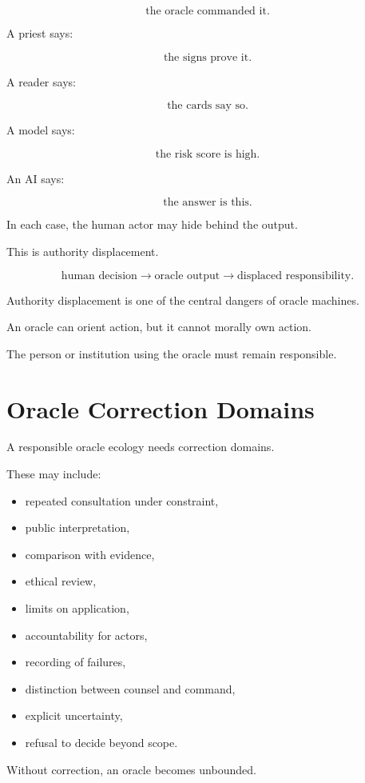 \documentclass[11pt]{book}
\begin{document}
\[
\text{the oracle commanded it}.
\]

A priest says:

\[
\text{the signs prove it}.
\]

A reader says:

\[
\text{the cards say so}.
\]

A model says:

\[
\text{the risk score is high}.
\]

An AI says:

\[
\text{the answer is this}.
\]

In each case, the human actor may hide behind the output.

This is authority displacement.

\[
\text{human decision}
\rightarrow
\text{oracle output}
\rightarrow
\text{displaced responsibility}.
\]

Authority displacement is one of the central dangers of oracle machines.

An oracle can orient action, but it cannot morally own action.

The person or institution using the oracle must remain responsible.

\section{Oracle Correction Domains}

A responsible oracle ecology needs correction domains.

These may include:

\begin{itemize}
    \item repeated consultation under constraint,
    \item public interpretation,
    \item comparison with evidence,
    \item ethical review,
    \item limits on application,
    \item accountability for actors,
    \item recording of failures,
    \item distinction between counsel and command,
    \item explicit uncertainty,
    \item refusal to decide beyond scope.
\end{itemize}

Without correction, an oracle becomes unbounded.
\end{document}
